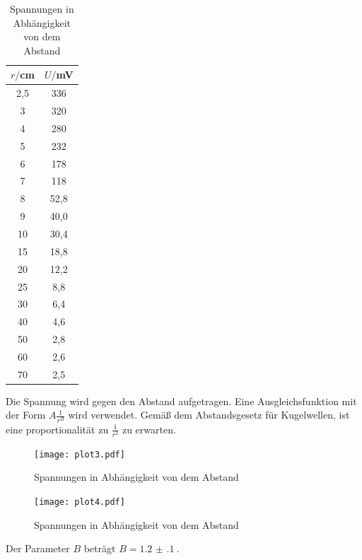 \begin{table}[H]
  \centering
  \caption{Spannungen in Abhängigkeit von dem Abstand}
  \label{tab:Phase}
  \begin{tabular}{c c}
    \toprule
    $r/$cm  &  $U/$mV \\
    \midrule
     2,5   &    336    \\
     3     &    320    \\
     4     &    280    \\
     5     &    232    \\
     6     &    178    \\
     7     &    118    \\
     8     &    52,8    \\
     9     &    40,0    \\
    10     &    30,4    \\
    15     &    18,8    \\
    20     &    12,2    \\
    25     &    8,8     \\
    30     &    6,4     \\
    40     &    4,6     \\
    50     &    2,8     \\
    60     &    2,6     \\
    70     &    2,5     \\
    \bottomrule
  \end{tabular}
\end{table}

Die Spannung wird gegen den Abstand aufgetragen. Eine Ausgleichsfunktion mit der Form $A \frac{1}{r^B}$ wird verwendet. Gemäß dem
Abstandsgesetz für Kugelwellen, ist eine proportionalität zu $\frac{1}{r^2}$ zu erwarten.

\begin{figure}[H]
  \centering
  \texttt{[image: plot3.pdf]}
  \caption{Spannungen in Abhängigkeit von dem Abstand}
  \label{fig:plot3}
\end{figure}

\begin{figure}[H]
  \centering
  \texttt{[image: plot4.pdf]}
  \caption{Spannungen in Abhängigkeit von dem Abstand}
  \label{fig:plot4}
\end{figure}

Der Parameter $B$ beträgt $B= \SI{1.2(1)}{}$.
